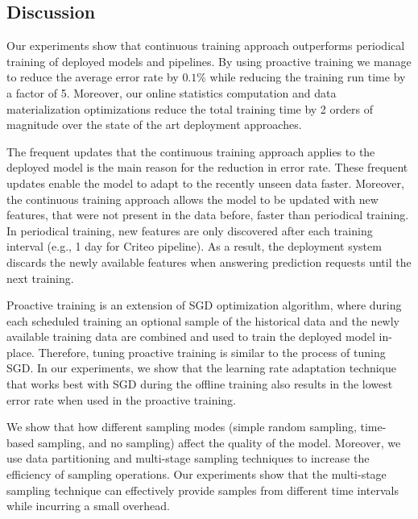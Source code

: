 \subsection{Discussion} \label{subsec:discussion}
Our experiments show that continuous training approach outperforms periodical training of deployed models and pipelines.
By using proactive training we manage to reduce the average error rate by $0.1\%$ while reducing the training run time by a factor of 5.
Moreover, our online statistics computation and data materialization optimizations reduce the total training time by 2 orders of magnitude over the state of the art deployment approaches.

The frequent updates that the continuous training approach applies to the deployed model is the main reason for the reduction in error rate.
These frequent updates enable the model to adapt to the recently unseen data faster.
Moreover, the continuous training approach allows the model to be updated with new features, that were not present in the data before, faster than periodical training.
In periodical training, new features are only discovered after each training interval (e.g., 1 day for Criteo pipeline).
As a result, the deployment system discards the newly available features when answering prediction requests until the next training.

Proactive training is an extension of SGD optimization algorithm, where during each scheduled training an optional sample of the historical data and the newly available training data are combined and used to train the deployed model in-place.
Therefore, tuning proactive training is similar to the process of tuning SGD.
In our experiments, we show that the learning rate adaptation technique that works best with SGD during the offline training also results in the lowest error rate when used in the proactive training.

We show that how different sampling modes (simple random sampling, time-based sampling, and no sampling) affect the quality of the model.
Moreover, we use data partitioning and multi-stage sampling techniques to increase the efficiency of sampling operations.
Our experiments show that the multi-stage sampling technique can effectively provide samples from different time intervals while incurring a small overhead.


 




